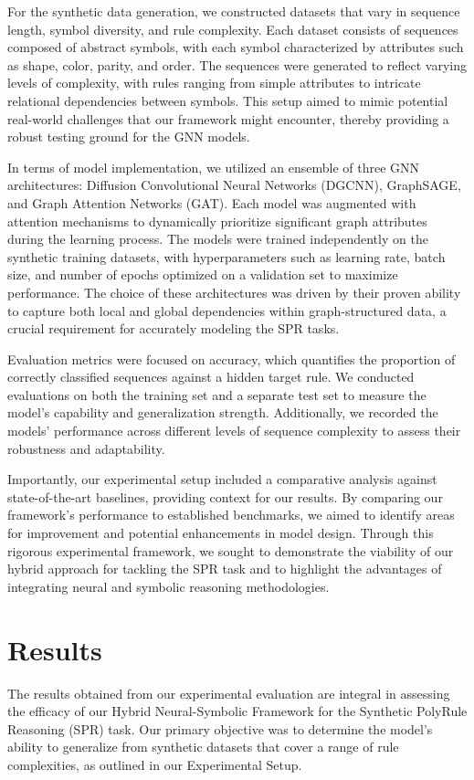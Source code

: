 \documentclass{article}
\begin{document}
For the synthetic data generation, we constructed datasets that vary in sequence length, symbol diversity, and rule complexity. Each dataset consists of sequences composed of abstract symbols, with each symbol characterized by attributes such as shape, color, parity, and order. The sequences were generated to reflect varying levels of complexity, with rules ranging from simple attributes to intricate relational dependencies between symbols. This setup aimed to mimic potential real-world challenges that our framework might encounter, thereby providing a robust testing ground for the GNN models.

In terms of model implementation, we utilized an ensemble of three GNN architectures: Diffusion Convolutional Neural Networks (DGCNN), GraphSAGE, and Graph Attention Networks (GAT). Each model was augmented with attention mechanisms to dynamically prioritize significant graph attributes during the learning process. The models were trained independently on the synthetic training datasets, with hyperparameters such as learning rate, batch size, and number of epochs optimized on a validation set to maximize performance. The choice of these architectures was driven by their proven ability to capture both local and global dependencies within graph-structured data, a crucial requirement for accurately modeling the SPR tasks.

Evaluation metrics were focused on accuracy, which quantifies the proportion of correctly classified sequences against a hidden target rule. We conducted evaluations on both the training set and a separate test set to measure the model's capability and generalization strength. Additionally, we recorded the models' performance across different levels of sequence complexity to assess their robustness and adaptability.

Importantly, our experimental setup included a comparative analysis against state-of-the-art baselines, providing context for our results. By comparing our framework's performance to established benchmarks, we aimed to identify areas for improvement and potential enhancements in model design. Through this rigorous experimental framework, we sought to demonstrate the viability of our hybrid approach for tackling the SPR task and to highlight the advantages of integrating neural and symbolic reasoning methodologies.

\section{Results}
The results obtained from our experimental evaluation are integral in assessing the efficacy of our Hybrid Neural-Symbolic Framework for the Synthetic PolyRule Reasoning (SPR) task. Our primary objective was to determine the model's ability to generalize from synthetic datasets that cover a range of rule complexities, as outlined in our Experimental Setup.
\end{document}
